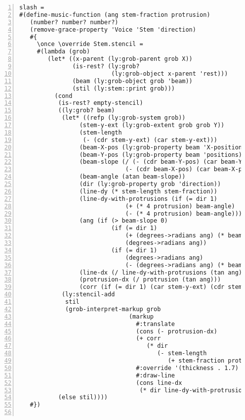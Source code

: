 \begin{Verbatim}[numbers=left,xleftmargin=5mm]
slash =
#(define-music-function (ang stem-fraction protrusion)
   (number? number? number?)
   (remove-grace-property 'Voice 'Stem 'direction)
   #{
     \once \override Stem.stencil =
     #(lambda (grob)
        (let* ((x-parent (ly:grob-parent grob X))
               (is-rest? (ly:grob?
                          (ly:grob-object x-parent 'rest)))
               (beam (ly:grob-object grob 'beam))
               (stil (ly:stem::print grob)))
          (cond
           (is-rest? empty-stencil)
           ((ly:grob? beam)
            (let* ((refp (ly:grob-system grob))
                 (stem-y-ext (ly:grob-extent grob grob Y))
                 (stem-length
                  (- (cdr stem-y-ext) (car stem-y-ext)))
                 (beam-X-pos (ly:grob-property beam 'X-positions))
                 (beam-Y-pos (ly:grob-property beam 'positions))
                 (beam-slope (/ (- (cdr beam-Y-pos) (car beam-Y-pos))
                              (- (cdr beam-X-pos) (car beam-X-pos))))
                 (beam-angle (atan beam-slope))
                 (dir (ly:grob-property grob 'direction))
                 (line-dy (* stem-length stem-fraction))
                 (line-dy-with-protrusions (if (= dir 1)
                              (+ (* 4 protrusion) beam-angle)
                              (- (* 4 protrusion) beam-angle)))
                 (ang (if (> beam-slope 0)
                          (if (= dir 1)
                              (+ (degrees->radians ang) (* beam-angle 0.7))
                              (degrees->radians ang))
                          (if (= dir 1)
                              (degrees->radians ang)
                              (- (degrees->radians ang) (* beam-angle 0.7)))))
                 (line-dx (/ line-dy-with-protrusions (tan ang)))
                 (protrusion-dx (/ protrusion (tan ang)))
                 (corr (if (= dir 1) (car stem-y-ext) (cdr stem-y-ext))))
            (ly:stencil-add
             stil
             (grob-interpret-markup grob
                               (markup
                                 #:translate
                                 (cons (- protrusion-dx)
                                 (+ corr
                                    (* dir
                                       (- stem-length
                                          (+ stem-fraction protrusion)))))
                                 #:override '(thickness . 1.7)
                                 #:draw-line
                                 (cons line-dx
                                  (* dir line-dy-with-protrusions)))))))
           (else stil))))
   #})


\end{Verbatim}
